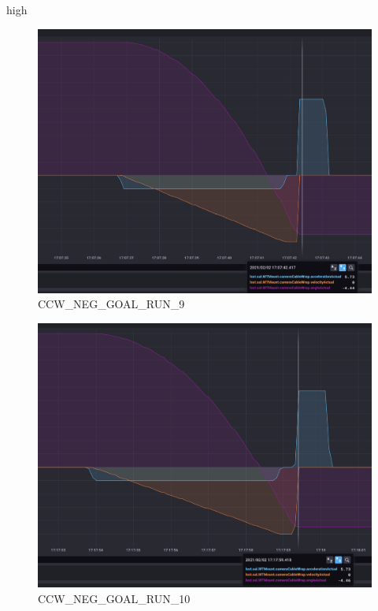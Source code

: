 high\documentclass[SE,lsstdraft,authoryear,toc]{lsstdoc}
\begin{document}
\begin{figure}[h!]
  \includegraphics[width=\linewidth]{media/CCW_high_speed_neg_test9.png}
  \caption{CCW\_NEG\_GOAL\_RUN\_9}
  \label{fig:CCW_NEG_GOAL_RUN_9}
\end{figure}
\begin{figure}[h!]
  \includegraphics[width=\linewidth]{media/CCW_high_speed_neg_test10.png}
  \caption{CCW\_NEG\_GOAL\_RUN\_10}
  \label{fig:CCW_NEG_GOAL_RUN_10}
\end{figure}
\end{document}
